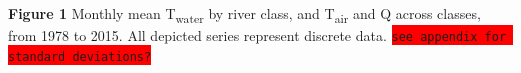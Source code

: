 \documentclass{article}
\begin{document}
\begin{center}
\end{center}
\textbf{Figure 1} Monthly mean T\textsubscript{water} by river class, and T\textsubscript{air} and Q across classes, from 1978 to 2015. All depicted series represent discrete data. \colorbox{red}{\lstinline{see appendix for standard deviations?}} \\[\baselineskip]
\end{document}
